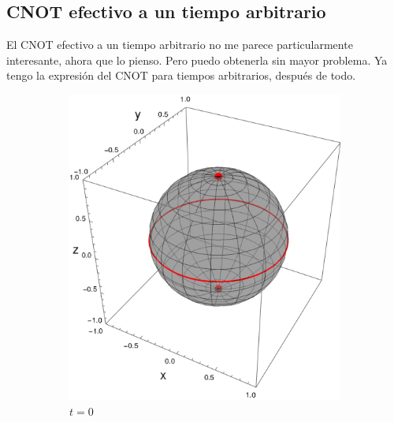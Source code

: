 \subsection{CNOT efectivo a un tiempo arbitrario}

El CNOT efectivo a un tiempo arbitrario no me parece particularmente interesante, ahora que lo pienso. Pero puedo obtenerla sin mayor problema. Ya tengo la expresión del CNOT para tiempos arbitrarios, después de todo.


  \begin{figure}[h!]
    \centering
    \begin{subfigure}{0.45\textwidth}
      \centering
      \includegraphics[width=0.9\linewidth]{maxent/figures/sphere_CNOT_t=0.0_z=0.8_p=0.95.png}
      \caption{$t=0$}
    \end{subfigure}%
    \begin{subfigure}{0.45\textwidth}
      \centering

\end{subfigure}
\end{figure}
